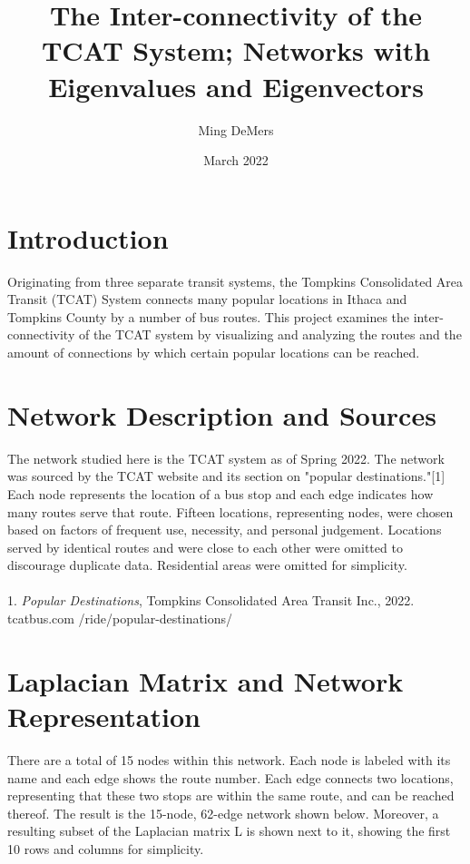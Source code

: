 \documentclass{article}
\title{The Inter-connectivity of the TCAT System; Networks with Eigenvalues and Eigenvectors}
\author{Ming DeMers}
\date{March 2022}
\begin{document}
\def\ind{\hspace*{0.3in}}
	\def\gap{0.2in}
\pagestyle{fancy}
\cfoot{\thepage}
\renewcommand{\headrulewidth}{0.4pt}
\renewcommand{\footrulewidth}{0.4pt}

\section{Introduction}
Originating from three separate transit systems, the Tompkins Consolidated Area Transit (TCAT) System connects many popular locations in Ithaca and Tompkins County by a number of bus routes. This project examines the inter-connectivity of the TCAT system by visualizing and analyzing the routes and the amount of connections by which certain popular locations can be reached. 

\section{Network Description and Sources}
The network studied here is the TCAT system as of Spring 2022. The network was sourced by the TCAT website and its section on "popular destinations."[1] Each node represents the location of a bus stop and each edge indicates how many routes serve that route. Fifteen locations, representing nodes, were chosen based on factors of frequent use, necessity, and personal judgement. Locations served by identical routes and were close to each other were omitted to discourage duplicate data. Residential areas were omitted for simplicity. 
\\
\\
1. \emph{Popular Destinations}, Tompkins Consolidated Area Transit Inc., 2022. tcatbus.com /ride/popular-destinations/

\section{Laplacian Matrix and Network Representation}
There are a total of 15 nodes within this network. Each node is labeled with its name and each edge shows the route number. Each edge connects two locations, representing that these two stops are within the same route, and can be reached thereof. The result is the 15-node, 62-edge network shown below. Moreover, a resulting subset of the Laplacian matrix L is shown next to it, showing the first 10 rows and columns for simplicity.
\end{document}
